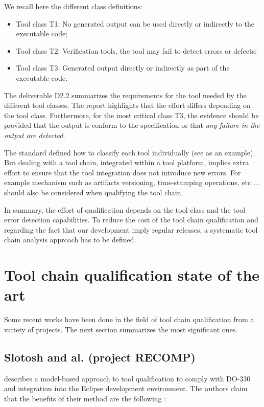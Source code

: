 \documentclass{openetcs_report}
\begin{document}
We recall here the different class definitions:
\begin{itemize}
\item Tool class T1: No generated output can be used directly or indirectly to the
  executable code;
\item Tool class T2: Verification tools, the tool may fail to detect errors or
  defects;
\item Tool class T3: Generated output directly or indirectly  as part of the
  executable code.
\end{itemize}
The deliverable D2.2 \cite{pokam_report_2013} summarizes the requirements for the
tool needed by the different tool classes. The report highlights that the
effort differs depending on the tool class. Furthermore, for
the most critical class T3,  the evidence should be provided that the output is
conform to the specification or that \emph{any failure in the output
  are detected}. 

The standard defined how to classify each tool individually (see
\cite{nielsen_efficient_2012,huang_test_2013} as an example).  But dealing with a tool
chain, integrated within a tool platform, implies extra effort to
ensure that the tool integration does not introduce new errors. For
example mechanism such as artifacts versioning, time-stamping
operations, etc ... should also be considered when qualifying the tool
chain.

In summary, the effort of qualification depends on the tool class and the tool
error detection capabilities. To reduce the cost of the tool chain qualification
and regarding the fact that our development imply regular releases, a systematic
tool chain analysis approach has to be defined.
 
\section{Tool  chain qualification state of the art}
\label{sec-1-2}
Some recent works have been done in the field of tool chain
qualification from a variety of projects. The next section summarizes
the most significant ones.

\subsection{Slotosh and al. (project RECOMP)}
\label{sec-1-2.1}

 \cite{slotosch_model-based_2012} describes a model-based approach to tool
 qualification to comply with DO-330 and integration into the Eclipse
 development environment. The authors claim that the benefits of their
 method  are the following :
\end{document}
